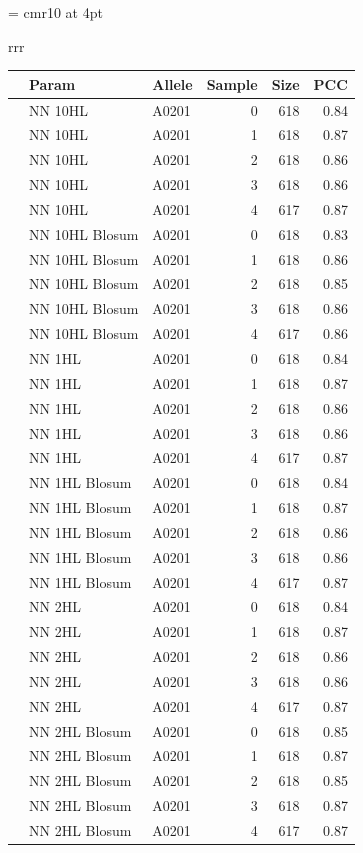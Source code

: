 \documentclass[presentation]{beamer}   %
\def\supertiny{ \font\supertinyfont = cmr10 at 4pt \relax \supertinyfont}
\begin{document}
\begin{frame}
\begin{table}[hb]\supertiny
\begin{center}
\begin{tabular}{rrr}

\begin{tabular}{rllrrr}
  \hline
 & Param & Allele & Sample & Size & PCC \\ 
  \hline
   & NN 10HL & A0201 &   0 & 618 & 0.84 \\ 
   & NN 10HL & A0201 &   1 & 618 & 0.87 \\ 
   & NN 10HL & A0201 &   2 & 618 & 0.86 \\ 
   & NN 10HL & A0201 &   3 & 618 & 0.86 \\ 
   & NN 10HL & A0201 &   4 & 617 & 0.87 \\ 
   \hline
   & NN 10HL Blosum & A0201 &   0 & 618 & 0.83 \\ 
   & NN 10HL Blosum & A0201 &   1 & 618 & 0.86 \\ 
   & NN 10HL Blosum & A0201 &   2 & 618 & 0.85 \\ 
   & NN 10HL Blosum & A0201 &   3 & 618 & 0.86 \\ 
   & NN 10HL Blosum & A0201 &   4 & 617 & 0.86 \\ 
   \hline
   & NN 1HL & A0201 &   0 & 618 & 0.84 \\ 
   & NN 1HL & A0201 &   1 & 618 & 0.87 \\ 
   & NN 1HL & A0201 &   2 & 618 & 0.86 \\ 
   & NN 1HL & A0201 &   3 & 618 & 0.86 \\ 
   & NN 1HL & A0201 &   4 & 617 & 0.87 \\ 
   \hline
   & NN 1HL Blosum & A0201 &   0 & 618 & 0.84 \\ 
   & NN 1HL Blosum & A0201 &   1 & 618 & 0.87 \\ 
   & NN 1HL Blosum & A0201 &   2 & 618 & 0.86 \\ 
   & NN 1HL Blosum & A0201 &   3 & 618 & 0.86 \\ 
   & NN 1HL Blosum & A0201 &   4 & 617 & 0.87 \\ 
   \hline
   & NN 2HL & A0201 &   0 & 618 & 0.84 \\ 
   & NN 2HL & A0201 &   1 & 618 & 0.87 \\ 
   & NN 2HL & A0201 &   2 & 618 & 0.86 \\ 
   & NN 2HL & A0201 &   3 & 618 & 0.86 \\ 
   & NN 2HL & A0201 &   4 & 617 & 0.87 \\ 
   \hline
   & NN 2HL Blosum & A0201 &   0 & 618 & 0.85 \\ 
   & NN 2HL Blosum & A0201 &   1 & 618 & 0.87 \\ 
   & NN 2HL Blosum & A0201 &   2 & 618 & 0.85 \\ 
   & NN 2HL Blosum & A0201 &   3 & 618 & 0.87 \\ 
   & NN 2HL Blosum & A0201 &   4 & 617 & 0.87 \\ 
   \hline
\end{tabular}



\end{tabular}
\end{center}
\end{table}
\end{frame}
\end{document}
